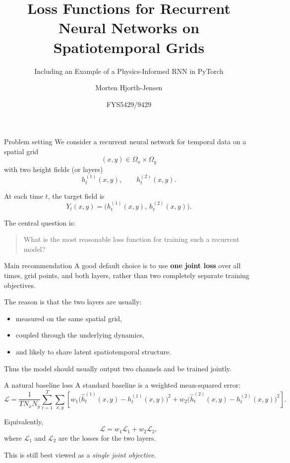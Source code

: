 \documentclass[aspectratio=169]{beamer}
\title{Loss Functions for Recurrent Neural Networks on Spatiotemporal Grids}
\subtitle{Including an Example of a Physics-Informed RNN in PyTorch}
\author{Morten Hjorth-Jensen}
\date{FYS5429/9429}
\begin{document}
\frame{\titlepage}

\begin{frame}{Problem setting}
We consider a recurrent neural network for temporal data on a spatial grid
\[
(x,y)\in \Omega_x\times\Omega_y
\]
with two height fields (or layers)
\[
h_t^{(1)}(x,y), \qquad h_t^{(2)}(x,y).
\]

At each time \(t\), the target field is
\[
Y_t(x,y)=\bigl(h_t^{(1)}(x,y),\,h_t^{(2)}(x,y)\bigr).
\]

The central question is:
\begin{quote}
What is the most reasonable loss function for training such a recurrent model?
\end{quote}
\end{frame}

\begin{frame}{Main recommendation}
A good default choice is to use \textbf{one joint loss} over all times, grid points, and both layers,
rather than two completely separate training objectives.

\medskip

The reason is that the two layers are usually:
\begin{itemize}
\item measured on the same spatial grid,
\item coupled through the underlying dynamics,
\item and likely to share latent spatiotemporal structure.
\end{itemize}

Thus the model should usually output two channels and be trained jointly.
\end{frame}

\begin{frame}{A natural baseline loss}
A standard baseline is a weighted mean-squared error:
\[
\mathcal{L}
=
\frac{1}{T N_x N_y}
\sum_{t=1}^{T}\sum_{x,y}
\left[
w_1\bigl(\hat h_t^{(1)}(x,y)-h_t^{(1)}(x,y)\bigr)^2
+
w_2\bigl(\hat h_t^{(2)}(x,y)-h_t^{(2)}(x,y)\bigr)^2
\right].
\]

Equivalently,
\[
\mathcal{L} = w_1 \mathcal{L}_1 + w_2 \mathcal{L}_2,
\]
where \(\mathcal{L}_1\) and \(\mathcal{L}_2\) are the losses for the two layers.

This is still best viewed as a \emph{single joint objective}.
\end{frame}
\end{document}
